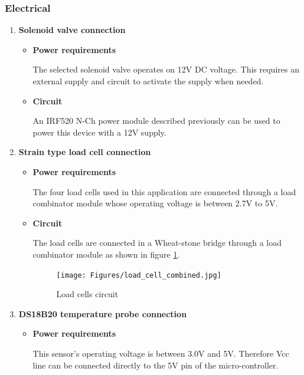 \subsubsection{Electrical}
\begin{enumerate}
    \item \textbf{Solenoid valve connection}
    \par
    \begin{itemize}
        \item \textbf{Power requirements}
        \par
        The selected solenoid valve operates on 12V DC voltage. This requires an external supply and circuit to activate the supply when needed.
        \item \textbf{Circuit}
        \par
        An IRF520 N-Ch power module described previously can be used to power this device with a 12V supply.
    \end{itemize}
    \item \textbf{Strain type load cell connection}
    \par
    \begin{itemize}
        \item \textbf{Power requirements}
        \par
        The four load cells used in this application are connected through a load combinator module whose operating voltage is between 2.7V to 5V.
        \item \textbf{Circuit}
        \par
        The load cells are connected in a Wheat-stone bridge through a load combinator module as shown in figure \ref{fig:load_cell_circuit}.
        \begin{figure}[H]
            \centering
            \texttt{[image: Figures/load\_cell\_combined.jpg]}
            \caption[Load cells circuit]{Load cells circuit \cite{loadcell}}
            \label{fig:load_cell_circuit}
        \end{figure}
    \end{itemize}
    \item \textbf{DS18B20 temperature probe connection}
    \par
    \begin{itemize}
        \item \textbf{Power requirements}
        \par
        This sensor's operating voltage is between 3.0V and 5V. Therefore Vcc line can be connected directly to the 5V pin of the micro-controller.
    \end{itemize}
\end{enumerate}
